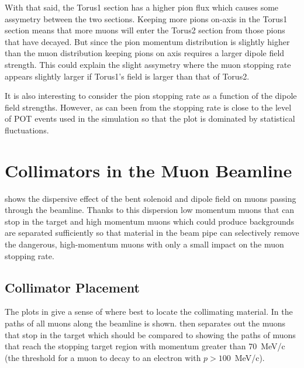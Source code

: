 With that said, the Torus1 section has a higher pion flux which causes some assymetry between the two sections.
Keeping more pions on-axis in the Torus1 section means that more muons will enter the Torus2 section from those pions that have decayed.
But since the pion momentum distribution is slightly higher than the muon distribution keeping pions on axis requires a larger dipole field strength.
This could explain the slight assymetry where the muon stopping rate appears slightly larger if Torus1's field is larger than that of Torus2.

It is also interesting to consider the pion stopping rate as a function of the dipole field strengths.
However, as can been from  the stopping rate is close to the level of POT events used in the simulation so that the plot is dominated by statistical fluctuations.

\section{Collimators in the Muon Beamline}
 shows the dispersive effect of the bent solenoid and dipole field on muons passing through the beamline.
Thanks to this dispersion low momentum muons that can stop in the target and high momentum muons which could produce backgrounds are separated sufficiently so that material in the beam pipe can selectively remove the dangerous, high-momentum muons with only a small impact on the muon stopping rate.

\subsection{Collimator Placement}
\FigOptimMuBeamCollimMuonPaths
The plots in  give a sense of where best to locate the collimating material.
In  the paths of all muons along the beamline is shown.
 then separates out the muons that stop in the target which should be compared to 
 showing the paths of muons that reach the stopping target region with momentum greater than 70~MeV/c (the threshold for a muon to decay to an electron with $p>100$~MeV/c).

